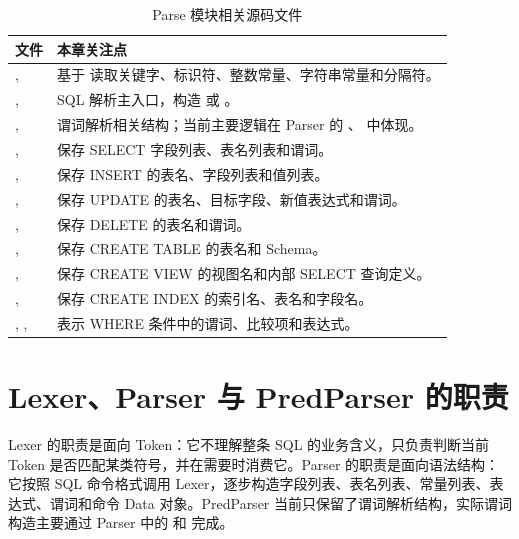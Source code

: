 \begin{table}[htbp]
  \centering
  \caption{Parse 模块相关源码文件}
  \label{tab:parse-source-files}
  \begin{tabularx}{\textwidth}{l Y}
    \toprule
    文件 & 本章关注点 \\
    \midrule
    ,  & 基于  读取关键字、标识符、整数常量、字符串常量和分隔符。\\
    ,  & SQL 解析主入口，构造  或 。\\
    ,  & 谓词解析相关结构；当前主要逻辑在 Parser 的 、 中体现。\\
    ,  & 保存 SELECT 字段列表、表名列表和谓词。\\
    ,  & 保存 INSERT 的表名、字段列表和值列表。\\
    ,  & 保存 UPDATE 的表名、目标字段、新值表达式和谓词。\\
    ,  & 保存 DELETE 的表名和谓词。\\
    ,  & 保存 CREATE TABLE 的表名和 Schema。\\
    ,  & 保存 CREATE VIEW 的视图名和内部 SELECT 查询定义。\\
    ,  & 保存 CREATE INDEX 的索引名、表名和字段名。\\
    , ,  & 表示 WHERE 条件中的谓词、比较项和表达式。\\
    \bottomrule
  \end{tabularx}
\end{table}

\section{Lexer、Parser 与 PredParser 的职责}
\label{sec:parse-lexer-parser}

Lexer 的职责是面向 Token：它不理解整条 SQL 的业务含义，只负责判断当前 Token 是否匹配某类符号，并在需要时消费它。Parser 的职责是面向语法结构：它按照 SQL 命令格式调用 Lexer，逐步构造字段列表、表名列表、常量列表、表达式、谓词和命令 Data 对象。PredParser 当前只保留了谓词解析结构，实际谓词构造主要通过 Parser 中的  和  完成。

